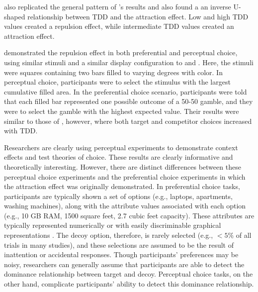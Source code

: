 \textcite{liaoInfluenceDistanceDecoy2021} also replicated the general pattern of \textcite{spektorWhenGoodLooks2018b}'s results and also found a an inverse U-shaped relationship between TDD and the attraction effect. Low and high TDD values created a repulsion effect, while intermediate TDD values created an attraction effect. 

\textcite{spektorRepulsionEffectPreferential2022} demonstrated the repulsion effect in both preferential and perceptual choice, using similar stimuli and a similar display configuration to \textcite{spektorWhenGoodLooks2018b} and \textcite{liaoInfluenceDistanceDecoy2021}. Here, the stimuli were squares containing two bars filled to varying degrees with color. In perceptual choice, participants were to select the stimulus with the largest cumulative filled area. In the preferential choice scenario, participants were told that each filled bar represented one possible outcome of a 50-50 gamble, and they were to select the gamble with the highest expected value. Their results were similar to those of \textcite{spektorWhenGoodLooks2018b}, however, where both target and competitor choices increased with TDD.

Researchers are clearly using perceptual experiments to demonstrate context effects and test theories of choice. These results are clearly informative and theoretically interesting. However, there are distinct differences between these perceptual choice experiments and the preferential choice experiments in which the attraction effect was originally demonstrated. In preferential choice tasks, participants are typically shown a set of options (e.g., laptops, apartments, washing machines), along with the attribute values associated with each option (e.g., 10 GB RAM, 1500 square feet, 2.7 cubic feet capacity). These attributes are typically represented numerically \parencite{hayes2024attribute,banerjeeFactorsThatPromote2024} or with easily discriminable graphical representations \parencite{cataldoComparisonProcessAccount2019b}. The decoy option, therefore, is rarely selected (e.g., $<5\%$ of all trials in many studies), and these selections are assumed to be the result of inattention or accidental responses. Though participants' preferences may be noisy, researchers can generally assume that participants are able to detect the dominance relationship between target and decoy. Perceptual choice tasks, on the other hand, complicate participants' ability to detect this dominance relationship.

